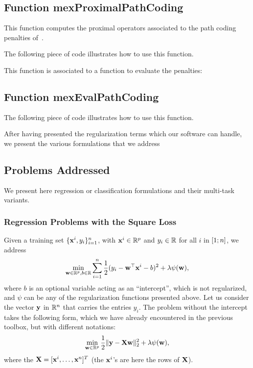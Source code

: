 \documentclass[a4paper, 11pt]{article}
\begin{document}
\subsection{Function mexProximalPathCoding}
This function computes the proximal operators associated to the path coding penalties of~\cite{mairal14}. 

The following piece of code illustrates how to use this function.

This function is associated to a function to evaluate the penalties:
\subsection{Function mexEvalPathCoding}

The following piece of code illustrates how to use this function.



After having presented the regularization terms which our software can handle,
we present the various formulations that we address
\subsection{Problems Addressed}
We present here regression or classification formulations and their multi-task variants.
\subsubsection{Regression Problems with the Square Loss}  %
Given a training set $\{{\mathbf x}^i,y_i\}_{i=1}^n$, with ${\mathbf x}^i \in {\mathbb R}^p$ and $y_i \in {\mathbb R}$ for all $i$ in $[ 1;n ]$, we address
\begin{displaymath}
\min_{{\mathbf w} \in {\mathbb R}^p, b \in {\mathbb R}} \sum_{i=1}^n \frac{1}{2}(y_i-{\mathbf w}^\top{\mathbf x}^i-b)^2 + \lambda\psi({\mathbf w}),
\end{displaymath}
where $b$ is an optional variable acting as an ``intercept'', which is not regularized, and $\psi$
can be any of the regularization functions presented above. 
Let us consider the vector ${\mathbf y}$ in ${\mathbb R}^n$ that carries the entries $y_i$. 
The problem without the intercept takes the following form, which we have already
encountered in the previous toolbox, but with different notations:
\begin{displaymath}
\min_{{\mathbf w} \in {\mathbb R}^p} \frac{1}{2}\|{\mathbf y}-{\mathbf X}{\mathbf w}\|_2^2 + \lambda\psi({\mathbf w}),
   \end{displaymath}
   where the ${\mathbf X}=[{\mathbf x}^i,\ldots,{\mathbf x}^n]^T$ (the ${\mathbf x}^i$'s are here the rows of ${\mathbf X}$).
\end{document}
